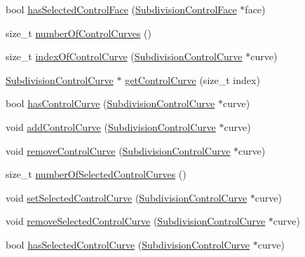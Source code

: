 \begin{DoxyCompactItemize}
\item 
bool \hyperlink{classShipCAD_1_1SubdivisionSurface_aab0e513988645c868676831ae0093a25}{has\-Selected\-Control\-Face} (\hyperlink{classShipCAD_1_1SubdivisionControlFace}{Subdivision\-Control\-Face} $\ast$face)
\item 
size\-\_\-t \hyperlink{classShipCAD_1_1SubdivisionSurface_a076772817afcb44926a3d898754261ce}{number\-Of\-Control\-Curves} ()
\item 
size\-\_\-t \hyperlink{classShipCAD_1_1SubdivisionSurface_a83c515916e068cbed7f7afd7bf11d84a}{index\-Of\-Control\-Curve} (\hyperlink{classShipCAD_1_1SubdivisionControlCurve}{Subdivision\-Control\-Curve} $\ast$curve)
\item 
\hyperlink{classShipCAD_1_1SubdivisionControlCurve}{Subdivision\-Control\-Curve} $\ast$ \hyperlink{classShipCAD_1_1SubdivisionSurface_a732c53d18277a4093ff7df12c0b08634}{get\-Control\-Curve} (size\-\_\-t index)
\item 
bool \hyperlink{classShipCAD_1_1SubdivisionSurface_acc30feeff1a889b9b291dcab3987b30a}{has\-Control\-Curve} (\hyperlink{classShipCAD_1_1SubdivisionControlCurve}{Subdivision\-Control\-Curve} $\ast$curve)
\item 
void \hyperlink{classShipCAD_1_1SubdivisionSurface_aa01ccc2ce7417960ca13075e38eb98e6}{add\-Control\-Curve} (\hyperlink{classShipCAD_1_1SubdivisionControlCurve}{Subdivision\-Control\-Curve} $\ast$curve)
\item 
void \hyperlink{classShipCAD_1_1SubdivisionSurface_abd51f7744580144550fabc086ea991b4}{remove\-Control\-Curve} (\hyperlink{classShipCAD_1_1SubdivisionControlCurve}{Subdivision\-Control\-Curve} $\ast$curve)
\item 
size\-\_\-t \hyperlink{classShipCAD_1_1SubdivisionSurface_a174e6e97b72c037693369e3716522ced}{number\-Of\-Selected\-Control\-Curves} ()
\item 
void \hyperlink{classShipCAD_1_1SubdivisionSurface_a5614a6ea5e1b67ec516328d64574cd9e}{set\-Selected\-Control\-Curve} (\hyperlink{classShipCAD_1_1SubdivisionControlCurve}{Subdivision\-Control\-Curve} $\ast$curve)
\item 
void \hyperlink{classShipCAD_1_1SubdivisionSurface_a1666628c8232ba11d386641fa7980ed7}{remove\-Selected\-Control\-Curve} (\hyperlink{classShipCAD_1_1SubdivisionControlCurve}{Subdivision\-Control\-Curve} $\ast$curve)
\item 
bool \hyperlink{classShipCAD_1_1SubdivisionSurface_acdfbfb4870bf517cd075fdf51a0de997}{has\-Selected\-Control\-Curve} (\hyperlink{classShipCAD_1_1SubdivisionControlCurve}{Subdivision\-Control\-Curve} $\ast$curve)

\end{DoxyCompactItemize}
